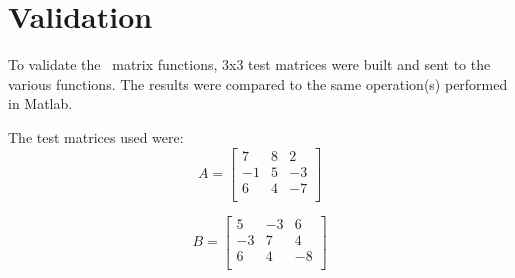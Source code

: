 


\section{Validation}\label{sec:valid}


\label{test:matrix_math}

To validate the \mathDesc\ matrix functions, 3x3 test matrices were
built and sent to the various functions. The results were compared to
the same operation(s) performed in Matlab.  

The test matrices used were:
\begin{equation}\nonumber
A = \left[
\begin{array}{rrr}
 7 &  8 &  2 \\
-1 &  5 & -3 \\
 6 &  4 & -7 \\
\end{array}\right]
\end{equation}

\begin{equation}\nonumber
B = \left[
\begin{array}{rrr}
 5 & -3 &  6 \\
-3 &  7 &  4 \\
 6 &  4 & -8 \\
\end{array}\right]
\end{equation}

